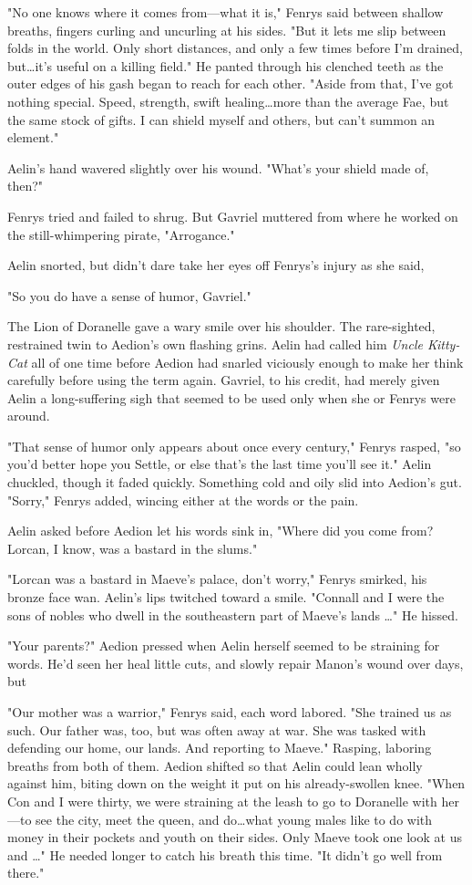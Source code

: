 "No one knows where it comes from---what it is," Fenrys said between shallow breaths, fingers curling and uncurling at his sides.
"But it lets me slip between folds in the world.
Only short distances, and only a few times before I'm drained, but\ldots it's useful on a killing field."
He panted through his clenched teeth as the outer edges of his gash began to reach for each other.
"Aside from that, I've got nothing special.
Speed, strength, swift healing\ldots more than the average Fae, but the same stock of gifts.
I can shield myself and others, but can't summon an element."

Aelin's hand wavered slightly over his wound.
"What's your shield made of, then?"

Fenrys tried and failed to shrug.
But Gavriel muttered from where he worked on the still-whimpering pirate, "Arrogance."

Aelin snorted, but didn't dare take her eyes off Fenrys's injury as she said,

"So you do have a sense of humor, Gavriel."

The Lion of Doranelle gave a wary smile over his shoulder.
The rare-sighted, restrained twin to Aedion's own flashing grins.
Aelin had called him \emph{Uncle Kitty-Cat} all of one time before Aedion had snarled viciously enough to make her think carefully before using the term again.
Gavriel, to his credit, had merely given Aelin a long-suffering sigh that seemed to be used only when she or Fenrys were around.

"That sense of humor only appears about once every century," Fenrys rasped, "so you'd better hope you Settle, or else that's the last time you'll see it."
Aelin chuckled, though it faded quickly.
Something cold and oily slid into Aedion's gut.
"Sorry," Fenrys added, wincing either at the words or the pain.

Aelin asked before Aedion let his words sink in, "Where did you come from?
Lorcan, I know, was a bastard in the slums."

"Lorcan was a bastard in Maeve's palace, don't worry," Fenrys smirked, his bronze face wan.
Aelin's lips twitched toward a smile.
"Connall and I were the sons of nobles who dwell in the southeastern part of Maeve's lands \ldots" He hissed.

"Your parents?"
Aedion pressed when Aelin herself seemed to be straining for words.
He'd seen her heal little cuts, and slowly repair Manon's wound over days, but 

"Our mother was a warrior," Fenrys said, each word labored.
"She trained us as such.
Our father was, too, but was often away at war.
She was tasked with defending our home, our lands.
And reporting to Maeve."
Rasping, laboring breaths from both of them.
Aedion shifted so that Aelin could lean wholly against him, biting down on the weight it put on his already-swollen knee.
"When Con and I were thirty, we were straining at the leash to go to Doranelle with her---to see the city, meet the queen, and do\ldots what young males like to do with money in their pockets and youth on their sides.
Only Maeve took one look at us and \ldots" He needed longer to catch his breath this time.
"It didn't go well from there."

